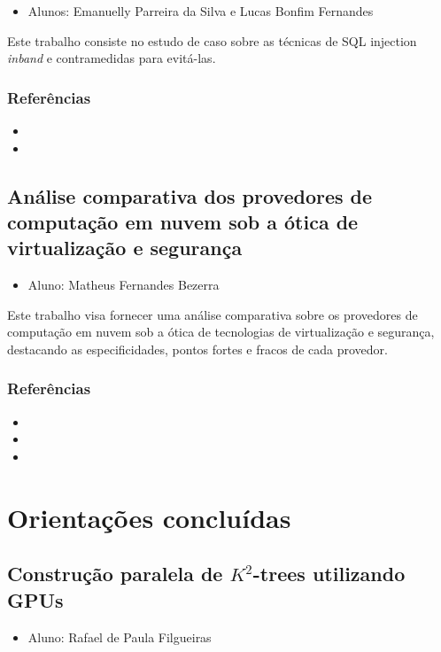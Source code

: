 \documentclass{article}
\newcommand*{\nsubsection}[1]{
    \subsection*{#1}
}
\begin{document}
\begin{itemize}
	\item Alunos: Emanuelly Parreira da Silva e Lucas Bonfim Fernandes
\end{itemize}


Este trabalho consiste no estudo de caso sobre as técnicas de SQL injection {\it inband} e contramedidas para evitá-las. 



\subsubsection*{Referências}
\begin{itemize}
	\item {}	
	\item {}
\end{itemize}

\nsubsection{Análise comparativa dos provedores de computação em nuvem sob a ótica de virtualização e segurança}

\begin{itemize}
	\item Aluno: Matheus Fernandes Bezerra
\end{itemize}


Este trabalho visa fornecer uma análise comparativa sobre os provedores de computação em nuvem sob a ótica de tecnologias de virtualização e segurança, destacando as especificidades, pontos fortes e fracos de cada provedor.




\subsubsection*{Referências}
\begin{itemize}
	\item {}	
	\item {}
	\item {}
\end{itemize}

\newpage
\section{Orientações concluídas}

\nsubsection{Construção paralela de $K^2$-trees utilizando GPUs}

\begin{itemize}
	\item Aluno: Rafael de Paula Filgueiras
\end{itemize}
\end{document}
